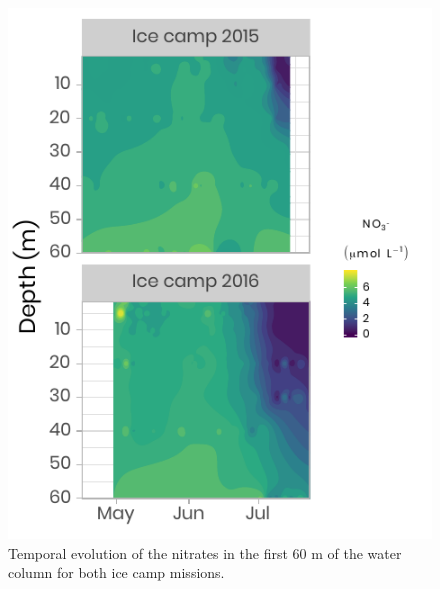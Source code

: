 \documentclass[12pt,a4paper]{scrartcl}
\begin{document}
\begin{figure}[h]
	\centering
	\includegraphics[scale = 2]{../../../graphs/fig6.pdf}
	\caption{Temporal evolution of the nitrates in the first 60 m of the water column for both ice camp missions.}
\end{figure}

\clearpage
\newpage
\end{document}
